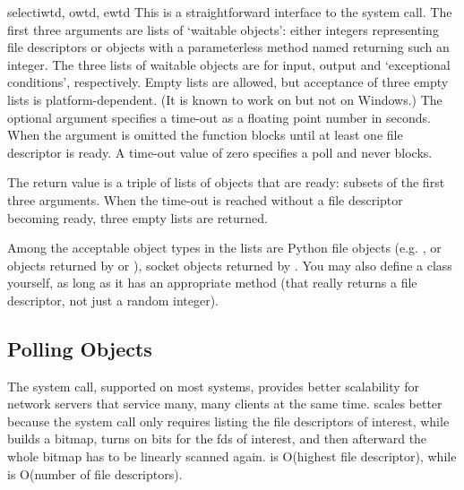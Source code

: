 \begin{funcdesc}{select}{iwtd, owtd, ewtd}
This is a straightforward interface to the \UNIX{} 
system call.  The first three arguments are lists of `waitable
objects': either integers representing file descriptors or
objects with a parameterless method named  returning
such an integer.  The three lists of waitable objects are for input,
output and `exceptional conditions', respectively.  Empty lists are
allowed, but acceptance of three empty lists is platform-dependent.
(It is known to work on \UNIX{} but not on Windows.)  The optional
 argument specifies a time-out as a floating point number
in seconds.  When the  argument is omitted the function
blocks until at least one file descriptor is ready.  A time-out value
of zero specifies a poll and never blocks.

The return value is a triple of lists of objects that are ready:
subsets of the first three arguments.  When the time-out is reached
without a file descriptor becoming ready, three empty lists are
returned.

Among the acceptable object types in the lists are Python file
objects (e.g. , or objects returned by
 or ), socket objects
returned by .%
You may also define a  class yourself, as long as it has
an appropriate  method (that really returns a file
descriptor, not just a random integer).
\end{funcdesc}

\subsection{Polling Objects
            \label{poll-objects}}

The  system call, supported on most \UNIX{} systems,
provides better scalability for network servers that service many,
many clients at the same time.
 scales better because the system call only
requires listing the file descriptors of interest, while 
builds a bitmap, turns on bits for the fds of interest, and then
afterward the whole bitmap has to be linearly scanned again.
 is O(highest file descriptor), while
 is O(number of file descriptors).

